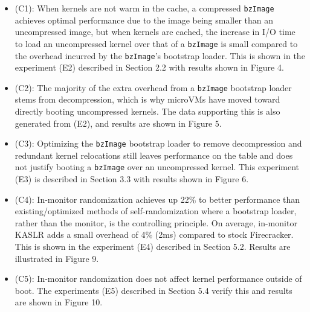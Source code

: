 \documentclass[sigplan,twocolumn]{acmart}
\begin{document}
{\begin{itemize}
    \item (C1): When kernels are not warm in the cache, a compressed \texttt{bzImage} achieves optimal performance
    due to the image being smaller than an uncompressed image, but when kernels are cached, the increase in I/O time
    to load an uncompressed kernel over that of a \texttt{bzImage} is small compared to the overhead incurred by the
    \texttt{bzImage}'s bootstrap loader. This is shown in the experiment (E2) described in Section 2.2 with results 
    shown in Figure 4.
    \item (C2): The majority of the extra overhead from a \texttt{bzImage} bootstrap loader stems from decompression, 
    which is why microVMs have moved toward directly booting uncompressed kernels. The data supporting this is also 
    generated from (E2), and results are shown in Figure 5.
    \item (C3): Optimizing the \texttt{bzImage} bootstrap loader to remove decompression and redundant kernel 
    relocations still leaves performance on the table and does not justify booting a \texttt{bzImage} over
    an uncompressed kernel. This experiment (E3) is described in Section 3.3 with results shown in Figure 6.
    \item (C4): In-monitor randomization achieves up 22\% to better performance than existing/optimized methods of self-randomization 
    where a bootstrap loader, rather than the monitor, is the controlling principle. On average, in-monitor KASLR adds a small overhead of 4\% (2ms)
    compared to stock Firecracker. This is shown in the experiment (E4) described in Section 5.2. Results are illustrated in Figure 9.
    \item (C5): In-monitor randomization does not affect kernel performance outside of boot. 
    The experiments (E5) described in Section 5.4 verify this and results are shown in Figure 10.
\end{itemize}

}
\end{document}
